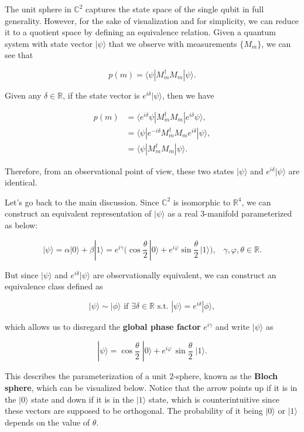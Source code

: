\documentclass{article}
\theoremstyle{definition}
\begin{document}
    The unit sphere in $\mathbb{C}^2$ captures the state space of the single qubit in full generality. However, for the sake of visualization and for simplicity, we can reduce it to a quotient space by defining an equivalence relation. Given a quantum system with state vector $|\psi \rangle$ that we observe with measurements $\{M_m\}$, we can see that

    \[p(m) = \langle \psi | M_m^\dagger M_m | \psi \rangle.\]

    Given any $\delta \in \mathbb{R}$, if the state vector is $e^{i\delta} |\psi \rangle$, then we have

    \begin{align*}
      p(m) & = \langle e^{i \delta} \psi | M_m^\dagger M_m | e^{i \delta} \psi \rangle, \\
      & = \langle \psi | e^{-i \delta} M_m^\dagger M_m e^{i \delta} | \psi \rangle, \\
      & = \langle \psi | M_m^\dagger M_m | \psi \rangle.
    \end{align*}

    Therefore, from an observational point of view, these two states $|\psi \rangle$ and $e^{i \delta} |\psi \rangle$ are identical.

    Let's go back to the main discussion. Since $\mathbb{C}^2$ is isomorphic to $\mathbb{R}^4$, we can construct an equivalent representation of $|\psi \rangle$ as a real 3-manifold parameterized as below:

      \[|\psi \rangle = \alpha |0 \rangle + \beta | 1 \rangle = e^{i \gamma} \bigg( \cos \frac{\theta}{2} \, |0 \rangle + e^{i \varphi} \sin \frac{\theta}{2} \, | 1\rangle \bigg), \;\;\; \gamma, \varphi, \theta \in \mathbb{R}.\]

    But since $|\psi \rangle$ and $e^{i \delta} |\psi \rangle$ are observationally equivalent, we can construct an equivalence class defined as

      \[|\psi\rangle \sim |\phi\rangle \text{ if } \exists \delta \in \mathbb{R} \text{ s.t. } |\psi \rangle = e^{i\delta} |\phi \rangle,\]

    which allows us to disregard the \textbf{global phase factor} $e^{i \gamma}$ and write $|\psi \rangle$ as

      \[|\psi \rangle = \cos \frac{\theta}{2} \; |0 \rangle + e^{i \varphi} \, \sin \frac{\theta}{2} \; |1 \rangle.\]

    This describes the parameterization of a unit $2$-sphere, known as the \textbf{Bloch sphere}, which can be visualized below. Notice that the arrow points up if it is in the $|0\rangle$ state and down if it is in the $|1\rangle$ state, which is counterintuitive since these vectors are supposed to be orthogonal. The probability of it being $|0\rangle$ or $|1\rangle$ depends on the value of $\theta$. 
\end{document}
